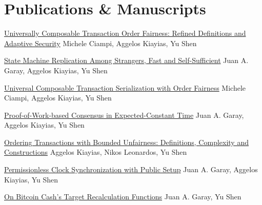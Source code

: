 \section{Publications \& Manuscripts}

{\href{https://eprint.iacr.org/2025/1527.pdf}{Universally Composable Transaction Order Fairness: Refined Definitions and Adaptive Security}}
{}
{}
{}
{\normalsize Michele Ciampi, Aggelos Kiayias, Yu Shen}

{\href{https://eprint.iacr.org/2025/616.pdf}{State Machine Replication Among Strangers, Fast and Self-Sufficient}}
{}
{}
{}
{\normalsize Juan A. Garay, Aggelos Kiayias, Yu Shen}

{\href{https://eprint.iacr.org/2024/1296.pdf}{Universal Composable Transaction Serialization with Order Fairness}}
{}
{}
{}
{\normalsize Michele Ciampi, Aggelos Kiayias, Yu Shen}

{\href{https://eprint.iacr.org/2023/1663.pdf}{Proof-of-Work-based Consensus in Expected-Constant Time}}
{}
{}
{}
{\normalsize Juan A. Garay, Aggelos Kiayias, Yu Shen}

{\href{https://eprint.iacr.org/2023/1253.pdf}{Ordering Transactions with Bounded Unfairness: Definitions, Complexity and Constructions}}
{}
{}
{}
{\normalsize Aggelos Kiayias, Nikos Leonardos, Yu Shen}

{\href{https://eprint.iacr.org/2022/1220.pdf}{Permissionless Clock Synchronization with Public Setup}}
{}
{}
{}
{\normalsize Juan A. Garay, Aggelos Kiayias, Yu Shen}

{\href{https://eprint.iacr.org/2021/143.pdf}{On Bitcoin Cash's Target Recalculation Functions}}
{}
{}
{}
{\normalsize Juan A. Garay, Yu Shen}